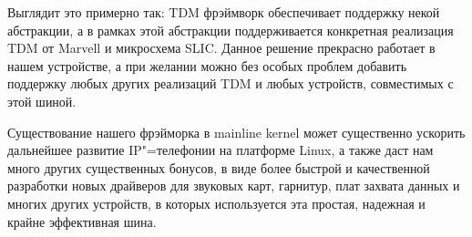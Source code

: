 \documentclass[10pt, a5paper]{article}
\begin{document}
Выглядит это примерно так: TDM фрэймворк обеспечивает поддержку некой
абстракции, а в рамках этой абстракции поддерживается конкретная
реализация TDM от Marvell и микросхема SLIC. Данное решение прекрасно
работает в нашем устройстве, а при желании можно без особых проблем
добавить поддержку любых других реализаций TDM и любых устройств,
совместимых с этой шиной.

Существование нашего фрэйморка в mainline kernel может существенно ускорить
дальнейшее развитие IP"=телефонии на платформе Linux, а также даст нам
много других существенных бонусов, в виде более быстрой и качественной
разработки новых драйверов для звуковых карт, гарнитур, плат захвата
данных и многих других устройств, в которых используется эта простая,
надежная и крайне эффективная шина.
\end{document}
